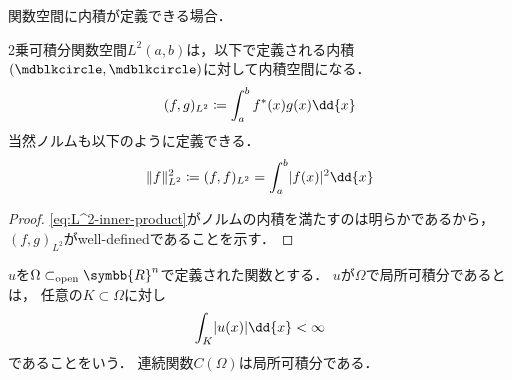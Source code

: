 \documentclass[../sotsu.tex]{subfiles}
\begin{document}
関数空間に内積が定義できる場合．

\begin{proposition}
    2乗可積分関数空間$L^2 (a, b)$は，以下で定義される内積$(\bigdot, \bigdot)$に対して内積空間になる．
    \begin{align}
        \label{eq:L^2-inner-product}
        (f, g)_{L^2} \coloneq \int_a^b \conj{f}(x) g(x) \dd{x}
    \end{align}
    当然ノルムも以下のように定義できる．
    \begin{align}
        \norm{f}_{L^2}^2 \coloneq (f, f)_{L^2} = \int_a^b \abs{f(x)}^2 \dd{x}
    \end{align}
\end{proposition}

\begin{proof}
    \cref{eq:L^2-inner-product}がノルムの内積を満たすのは明らかであるから，
    $(f, g)_{L^2}$がwell-definedであることを示す．
    
\end{proof}


$u$を$\Omega \subset_{\text{open}} \symbb{R}^n$で定義された関数とする．
$u$が$\Omega$で局所可積分であるとは，
任意の$K \subset \Omega$に対し
\begin{equation*}
    \int_K \abs{ u(x) } \dd{x} < \infty
\end{equation*}
であることをいう．
連続関数$C(\Omega)$は局所可積分である．
\end{document}
